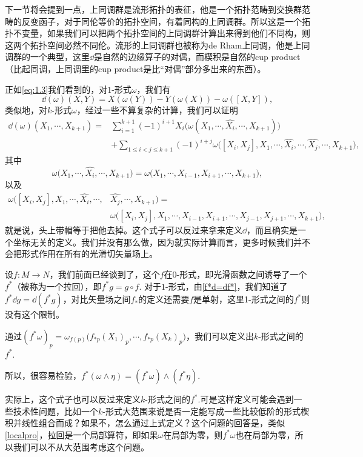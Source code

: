 下一节将会提到一点，上同调群是流形拓扑的表征，他是一个拓扑范畴到交换群范畴的反变函子，对于同伦等价的拓扑空间，有着同构的上同调群。所以这是一个拓扑不变量，如果我们可以把两个拓扑空间的上同调群计算出来得到他们不同构，则这两个拓扑空间必然不同伦。流形的上同调群也被称为de Rham上同调，他是上同调群的一个典型，这里$\dd$是自然的边缘算子的对偶，而楔积是自然的cup product（比起同调，上同调里的cup product是比“对偶”部分多出来的东西）。

\para 正如\eqref{eq:1.3}我们看到的，对$1$-形式$\omega$，我们有
\[
	\dd(\omega)(X,Y)=X(\omega(Y))-Y(\omega(X))-\omega([X,Y]),
\]
类似地，对$k$-形式$\omega$，经过一些不算复杂的计算，我们可以证明
\[
\begin{split}
	\dd(\omega)(X_1,\cdots,X_{k+1})=&\sum_{i=1}^{k+1}(-1)^{i+1}X_i\bigl(\omega(X_1,\cdots,\hat{X_i},\cdots,X_{k+1})\bigr)\\
	&+\sum_{1\leq i<j\leq k+1}(-1)^{i+j}\omega\bigl([X_i,X_j],X_1,\cdots,\hat{X_i},\cdots,\hat{X_j},\cdots,X_{k+1}\bigr),
\end{split}
\]
其中
\[
	\omega\bigl(X_1,\cdots,\hat{X_i},\cdots,X_{k+1}\bigr)=\omega\bigl(X_1,\cdots,X_{i-1},X_{i+1},\cdots,X_{k+1}\bigr),
\]
以及
\[
\begin{split}
	\omega\bigl([X_i,X_j],X_1,\cdots,\hat{X_i},\cdots,&\hat{X_j},\cdots,X_{k+1}\bigr)=\\
	&\omega\bigl([X_i,X_j],X_1,\cdots,X_{i-1},X_{i+1},\cdots,X_{j-1},X_{j+1},\cdots,X_{k+1}\bigr),
\end{split}
\]
就是说，头上带帽等于把他去掉。这个式子可以反过来拿来定义$\dd$，而且确实是一个坐标无关的定义。我们并没有那么做，因为就实际计算而言，更多时候我们并不会把形式作用在所有的光滑切矢量场上。

\para 设$f:M\to N$，我们前面已经谈到了，这个$f$在0-形式，即光滑函数之间诱导了一个$f^*$（被称为一个拉回），即$f^*g=g\circ f$. 对于$1$-形式，由\eqref{f*d=df*}，我们知道了$f^*\dd g=\dd (f^* g)$，对比矢量场之间$f_*$的定义还需要$f$是单射，这里1-形式之间的$f^*$则没有这个限制。

\para 通过$(f^*\omega)_p=\omega_{f(p)}\bigl(f_{*p}(X_1)_p,\cdots,f_{*p}(X_k)_p\bigr)$，我们可以定义出$k$-形式之间的$f^*$.

\para 所以，很容易检验，$f^*(\omega\wedge \eta)=(f^*\omega)\wedge (f^*\eta)$.

实际上，这个式子也可以反过来定义$k$-形式之间的$f^*$.可是这样定义可能会遇到一些技术性问题，比如一个$k$-形式大范围来说是否一定能写成一些比较低阶的形式楔积并线性组合而成？如果不，怎么通过上式定义？这个问题的回答是，类似\eqref{localpro}，拉回是一个局部算符，即如果$\omega$在局部为零，则$f^*\omega$也在局部为零，所以我们可以不从大范围考虑这个问题。

